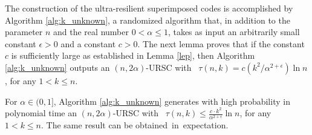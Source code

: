 \documentclass[11pt]{article}
\begin{document}
The construction of the ultra-resilient superimposed codes is accomplished by Algorithm \ref{alg:k_unknown}, 
a randomized algorithm that, in addition to the parameter $n$ and the real number $0 < \alpha \le 1$,
takes as input an arbitrarily small constant $\epsilon > 0$ and a constant $c > 0$. 
The next lemma proves that if the constant $c$ is  
sufficiently large as established in Lemma \ref{lep}, then Algorithm \ref{alg:k_unknown}
outputs an $(n, 2\alpha)$-URSC with \elongation\ 
$\tau(n,k) = c (k^2/\alpha^{2+\epsilon})\ln n$, for any $1 < k \le n$.


\begin{lemma}
\label{thm:unknown-k}
For 
$\alpha\in(0,1]$, Algorithm \ref{alg:k_unknown} generates with high probability in polynomial time 
an $(n, 2\alpha)$-URSC with \elongation\ 
$\tau(n,k) \le \frac{c\cdot k^2}{\alpha^{2+\epsilon}} \ln n$, for any $1 < k \le n$. 
The same 
result 
can 
be obtained~in~expectation.
\end{lemma}
\end{document}

